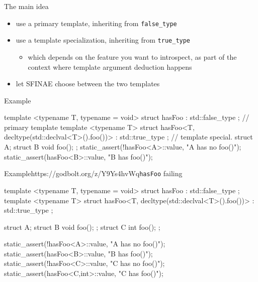 \begin{frame}[fragile]
  \begin{block}{The main idea}
    \begin{itemize}
    \item use a primary template, inheriting from \texttt{false_type}
    \item use a template specialization, inheriting from \texttt{true_type}
    \begin{itemize}
      \item which depends on the feature you want to introspect,
            as part of the context where template argument deduction happens
    \end{itemize}
    \item let SFINAE choose between the two templates
    \end{itemize}
  \end{block}
  \begin{exampleblock}{Example}
    \small
    \begin{cppcode*}{}
      template <typename T, typename = void>
      struct hasFoo : std::false_type {}; // primary template
      template <typename T>
      struct hasFoo<T, decltype(std::declval<T>().foo())>
        : std::true_type {};              // template special.
      struct A{}; struct B{ void foo(); };
      static_assert(!hasFoo<A>::value, "A has no foo()");
      static_assert(hasFoo<B>::value, "B has foo()");
    \end{cppcode*}
  \end{exampleblock}
\end{frame}

\begin{frame}[fragile]
  \begin{exampleblockGB}{Example}{https://godbolt.org/z/Y9Ys4hvWq}{\texttt{hasFoo} failing}
    \small
    \begin{cppcode*}{}
      template <typename T, typename = void>
      struct hasFoo : std::false_type {};
      template <typename T>
      struct hasFoo<T, decltype(std::declval<T>().foo())>
        : std::true_type {};

      struct A{};
      struct B{ void foo(); };
      struct C{ int  foo(); };

      static_assert(!hasFoo<A>::value, "A has no foo()");
      static_assert(hasFoo<B>::value, "B has foo()");
      static_assert(!hasFoo<C>::value, "C has no foo()");
      static_assert(hasFoo<C,int>::value, "C has foo()");
    \end{cppcode*}
  \end{exampleblockGB}
\end{frame}

